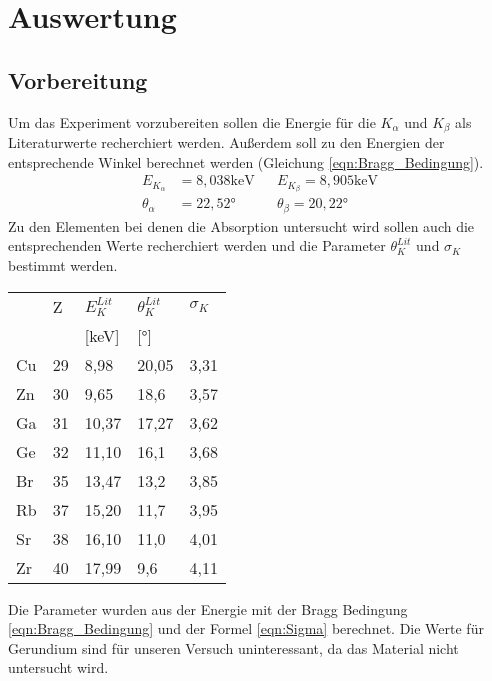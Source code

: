 \section{Auswertung}
\label{sec:Auswertung}
\subsection{Vorbereitung}
Um das Experiment vorzubereiten sollen die Energie für die $K_{\alpha}$ und $K_{\beta}$ als Literaturwerte recherchiert werden.
Außerdem soll zu den Energien der entsprechende Winkel berechnet werden (Gleichung \ref{eqn:Bragg_Bedingung}).
\begin{align}
    E_{K_{\alpha}} &= 8,038 \text{keV} && E_{K_{\beta}} = 8,905 \text{keV} \nonumber \\
    \theta_{\alpha} &= 22,52°    &&      \theta_{\beta} = 20,22° \nonumber
\end{align}
Zu den Elementen bei denen die Absorption untersucht wird sollen auch die entsprechenden Werte recherchiert werden und die Parameter $\theta_K^{Lit}$ und $\sigma_K$ bestimmt werden.
\begin{table}[H]
\centering
\begin{tabular}{lllll}
  & Z & $E_K^{Lit}$ & $\theta_K^{Lit}$ & $\sigma_K$\\
  &   & [keV] & [°] &  \\
  \toprule
Cu & 29 & 8,98 & 20,05 & 3,31\\
\midrule
Zn & 30 & 9,65 & 18,6 & 3,57\\
\midrule
Ga & 31 & 10,37 & 17,27 & 3,62\\
\midrule
Ge & 32 & 11,10 & 16,1 & 3,68\\ 
\midrule
Br & 35 & 13,47 & 13,2 & 3,85\\ 
\midrule
Rb & 37 & 15,20 & 11,7 & 3,95\\ 
\midrule
Sr & 38 & 16,10 & 11,0 & 4,01\\
\midrule
Zr & 40 & 17,99 & 9,6 & 4,11\\
\bottomrule
\end{tabular}
\end{table}
Die Parameter wurden aus der Energie mit der Bragg Bedingung \ref{eqn:Bragg_Bedingung} und der Formel \ref{eqn:Sigma} berechnet.
Die Werte für Gerundium sind für unseren Versuch uninteressant, da das Material nicht untersucht wird.
